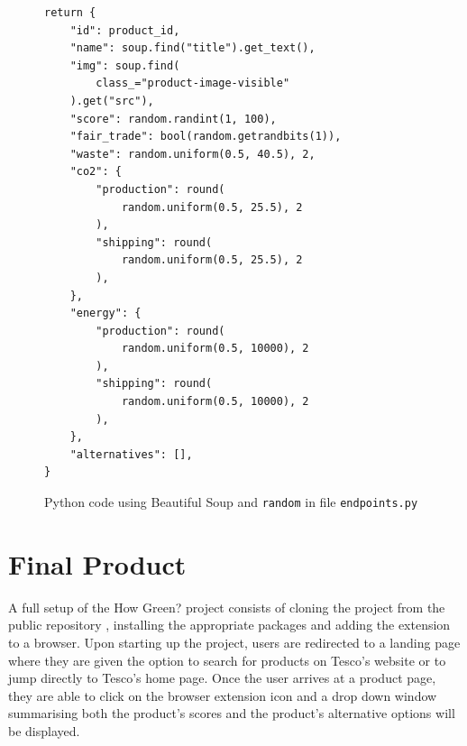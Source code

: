 \documentclass[a4,10pt,twocolumn]{article}
\begin{document}
\begin{figure}[h]
\centering
\begin{verbatim}
return {
    "id": product_id,
    "name": soup.find("title").get_text(),
    "img": soup.find(
        class_="product-image-visible"
    ).get("src"),
    "score": random.randint(1, 100),
    "fair_trade": bool(random.getrandbits(1)),
    "waste": random.uniform(0.5, 40.5), 2,
    "co2": {
        "production": round(
            random.uniform(0.5, 25.5), 2
        ),
        "shipping": round(
            random.uniform(0.5, 25.5), 2
        ),
    },
    "energy": {
        "production": round(
            random.uniform(0.5, 10000), 2
        ),
        "shipping": round(
            random.uniform(0.5, 10000), 2
        ),
    },
    "alternatives": [],
}
\end{verbatim}
\caption{Python code using Beautiful Soup and \texttt{random} in file \texttt{endpoints.py}}
\end{figure}



\section*{Final Product}

A full setup of the How Green? project consists of cloning the project from the public repository \cite{howgreen}, installing the appropriate packages and adding the extension to a browser. Upon starting up the project, users are redirected to a landing page where they are given the option to search for products on Tesco's website or to jump directly to Tesco's home page. Once the user arrives at a product page, they are able to click on the browser extension icon and a drop down window summarising both the product's scores and the product's alternative options will be displayed.
\end{document}
